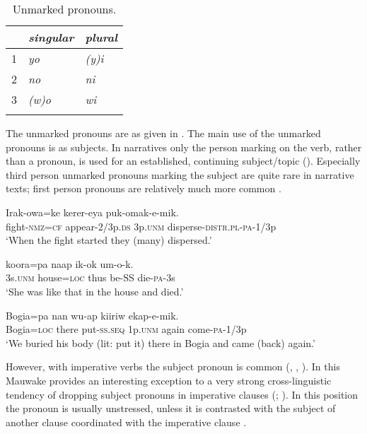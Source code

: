 \begin{table}[h]
 \caption{Unmarked pronouns.}
\label{tab:3:unmarkedpronouns}

\begin{tabular}{l>{\itshape}l>{\itshape}l}
\mytoprule
 &\upshape singular &\upshape plural\\
\midrule
1 &yo &(y)i\\
2 &no &ni\\
3 &(w)o &wi\\
\mybottomrule 
\end{tabular}
\end{table}

The unmarked pronouns are as given in .
The main use of the unmarked pronouns is as subjects. In narratives only the person marking on the verb, rather than a pronoun, is used for an established, continuing subject/topic (). Especially third person unmarked pronouns marking the subject are quite rare in narrative texts; first person pronouns are relatively much more common \citep[79--80]{Jarvinen1991}. 

\ea 
\gll Irak-owa=ke kerer-eya   puk-omak-e-mik.\\
fight-\textsc{nmz}=\textsc{cf} appear-2/3p.\textsc{ds} 3p.\textsc{unm} disperse-\textsc{distr}.\textsc{pl}-\textsc{pa}-1/3p\\
\glt`When the fight started they (many) dispersed.'
\z

\ea%
\label{ex:3:x534}
\gll {} koora=pa naap ik-ok um-o-k. \\
3s.\textsc{unm} house=\textsc{loc} thus be-SS die-\textsc{pa}-3s\\
\glt`She was like that in the house and died.'
\z

\ea%
\label{ex:3:x1803}
\gll Bogia=pa nan wu-ap  kiiriw ekap-e-mik. \\
Bogia=\textsc{loc} there put-\textsc{ss}.\textsc{seq} 1p.\textsc{unm} again come-\textsc{pa}-1/3p\\
\glt`We buried his body (lit: put it) there in Bogia and came (back) again.'
\z

However, with imperative verbs the subject pronoun is common (, , ). In this Mauwake provides an interesting exception to a very strong cross-linguistic tendency of dropping subject pronouns in imperative clauses (\citealt[80]{Givon1979}; \citealt[173--174]{SadockEtAl1985}). In this position the pronoun is usually unstressed, unless it is contrasted with the subject of another clause coordinated with the imperative clause . 

